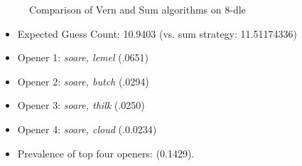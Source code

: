 \documentclass[11pt, oneside]{article} 	%
\begin{document}
\begin{figure}[!htb]
 \centering
 \qquad
 \caption{Comparison of Vern and Sum algorithms on 8-dle}%
\end{figure}


\begin{itemize}
\item Expected Guess Count: 10.9403 (vs. sum strategy: 11.51174336)
\item Opener 1: \emph{soare, lemel} (.0651)
\item Opener 2: \emph{soare, butch} (.0294)
\item Opener 3: \emph{soare, thilk} (.0250)
\item Opener 4: \emph{soare, cloud} (.0.0234)
\item Prevalence of top four openers: (0.1429). 
\end{itemize}
\end{document}
